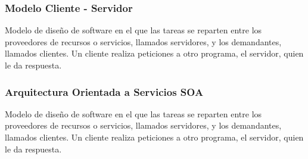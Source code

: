 		
		\subsubsection{Modelo Cliente - Servidor}
		
		{Modelo de diseño de software en el que las tareas se reparten entre los proveedores de recursos o servicios, llamados servidores, y los demandantes, llamados clientes. Un cliente realiza peticiones a otro programa, el servidor, quien le da respuesta.}
	
	
		\subsubsection{Arquitectura Orientada a Servicios SOA}
		
		{Modelo de diseño de software en el que las tareas se reparten entre los proveedores de recursos o servicios, llamados servidores, y los demandantes, llamados clientes. Un cliente realiza peticiones a otro programa, el servidor, quien le da respuesta.}